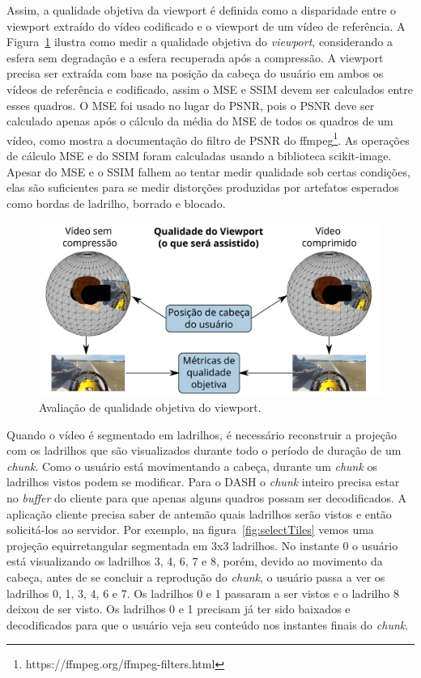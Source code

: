 Assim, a qualidade objetiva da viewport é definida como a disparidade entre o viewport extraído do vídeo codificado e o viewport de um vídeo de referência.   A Figura~\ref{fig:QualityWorkflow} ilustra como medir a qualidade objetiva do \textit{viewport}, considerando a esfera sem degradação e a esfera recuperada após a compressão. A viewport precisa ser extraída com base na posição da cabeça do usuário em ambos os vídeos de referência e codificado, assim o MSE e SSIM devem ser calculados entre esses quadros. O MSE foi usado no lugar do PSNR, pois o PSNR deve ser calculado apenas após o cálculo da média do MSE de todos os quadros de um vídeo, como mostra a documentação do filtro de PSNR do ffmpeg\footnote{https://ffmpeg.org/ffmpeg-filters.html}. As operações de cálculo MSE e do SSIM foram calculadas usando a biblioteca scikit-image. Apesar do MSE e o SSIM falhem ao tentar medir qualidade sob certas condições, elas são suficientes para se medir distorções produzidas por artefatos esperados como bordas de ladrilho, borrado e blocado.~\cite{Bovik2009} 

\begin{figure}[ht]
    \centering
    \includegraphics[width=0.8\linewidth]{fig/Project_Quality_Workflow_2.png}
    \caption{Avaliação de qualidade objetiva do viewport.}
    \label{fig:QualityWorkflow}
\end{figure}

Quando o vídeo é segmentado em ladrilhos, é necessário reconstruir a projeção com os ladrilhos que são visualizados durante todo o período de duração de um \textit{chunk}. Como o usuário está movimentando a cabeça, durante um \textit{chunk} os ladrilhos vistos podem se modificar. Para o DASH o \textit{chunk} inteiro precisa estar no \textit{buffer} do cliente para que apenas alguns quadros possam ser decodificados. A aplicação cliente precisa saber de antemão quais ladrilhos serão vistos e então solicitá-los ao servidor. Por exemplo, na figura~\ref{fig:selectTiles} vemos uma projeção equirretangular segmentada em 3x3 ladrilhos. No instante 0 o usuário está visualizando os ladrilhos 3, 4, 6, 7 e 8, porém, devido ao movimento da cabeça, antes de se concluir a reprodução do \textit{chunk}, o usuário passa a ver os ladrilhos 0, 1, 3, 4, 6 e 7. Os ladrilhos 0 e 1 passaram a ser vistos e o ladrilho 8 deixou de ser visto. Os ladrilhos 0 e 1 precisam já ter sido baixados e decodificados para que o usuário veja seu conteúdo nos instantes finais do \textit{chunk}.

